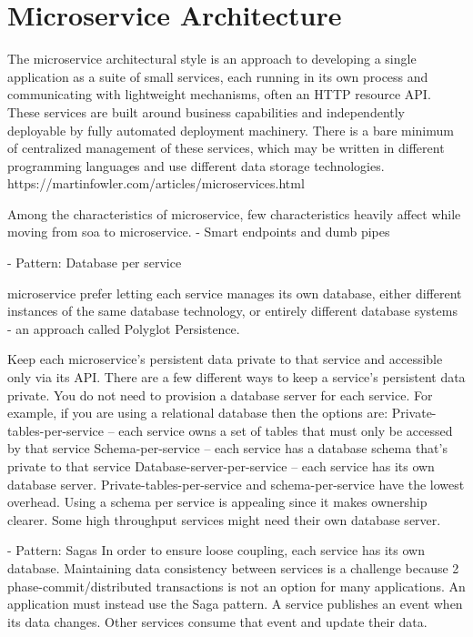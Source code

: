 \section{Microservice Architecture}

The microservice architectural style is an approach to developing a single application as a suite of small services, each running in its own process and communicating with lightweight mechanisms, often an HTTP resource API. These services are built around business capabilities and independently deployable by fully automated deployment machinery. There is a bare minimum of centralized management of these services, which may be written in different programming languages and use different data storage technologies. https://martinfowler.com/articles/microservices.html

Among the characteristics of \acrfull{microservice}, few characteristics heavily affect while moving from \acrshort{soa} to \acrshort{microservice}.
- Smart endpoints and dumb pipes \cite{LewisMicroservicesPipes}
  
- Pattern: Database per service \cite{LewisMicroservicesManagement}

  \acrshort{microservice} prefer letting each service manages its own database, either different instances of the same database technology, or entirely different database systems - an approach called Polyglot Persistence.
  
  \cite{RichardsonMicroservicesService}
  Keep each microservice’s persistent data private to that service and accessible only via its API. 
There are a few different ways to keep a service’s persistent data private. You do not need to provision a database server for each service. For example, if you are using a relational database then the options are:
Private-tables-per-service – each service owns a set of tables that must only be accessed by that service
Schema-per-service – each service has a database schema that’s private to that service
Database-server-per-service – each service has its own database server.
Private-tables-per-service and schema-per-service have the lowest overhead. Using a schema per service is appealing since it makes ownership clearer. Some high throughput services might need their own database server.

  
- Pattern: Sagas \cite{RichardsonMicroservicesSagas}
  In order to ensure loose coupling, each service has its own database. Maintaining data consistency between services is a challenge because 2 phase-commit/distributed transactions is not an option for many applications. An application must instead use the Saga pattern. A service publishes an event when its data changes. Other services consume that event and update their data.

